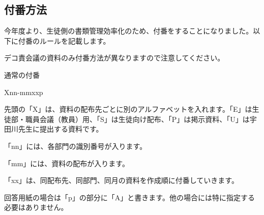 \begin{multicols*}{2}
\section{付番方法}
今年度より、生徒側の書類管理効率化のため、付番をすることになりました。以下に付番のルールを記載します。

デコ責会議の資料のみ付番方法が異なりますので注意してください。
\begin{framebox-simple}{通常の付番}
\begin{center}
    {\selectsize{15pt}{15pt}Xnn-mmxxp}
    \vspace{0.5\zw}
\end{center}
\begin{reitemize}
    \item 先頭の「X」は、資料の配布先ごとに別のアルファベットを入れます。「E」は生徒部・職員会議（教員）用、「S」は生徒向け配布、「P」は掲示資料、「U」は宇田川先生に提出する資料です。
    \item 「nn」には、各部門の識別番号が入ります。
    \item 「mm」には、資料の配布が入ります。
    \item 「xx」は、同配布先、同部門、同月の資料を作成順に付番していきます。
    \item 回答用紙の場合は「p」の部分に「A」と書きます。他の場合には特に指定する必要はありません。
\end{reitemize}
\end{framebox-simple}
\\
\\


\end{multicols*}
